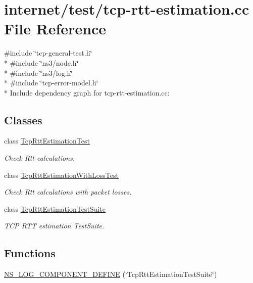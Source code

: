 \hypertarget{tcp-rtt-estimation_8cc}{}\section{internet/test/tcp-\/rtt-\/estimation.cc File Reference}
\label{tcp-rtt-estimation_8cc}
{\ttfamily \#include \char`\"{}tcp-\/general-\/test.\+h\char`\"{}}\\*
{\ttfamily \#include \char`\"{}ns3/node.\+h\char`\"{}}\\*
{\ttfamily \#include \char`\"{}ns3/log.\+h\char`\"{}}\\*
{\ttfamily \#include \char`\"{}tcp-\/error-\/model.\+h\char`\"{}}\\*
Include dependency graph for tcp-\/rtt-\/estimation.cc\+:
\subsection*{Classes}
\begin{DoxyCompactItemize}
\item 
class \hyperlink{classTcpRttEstimationTest}{Tcp\+Rtt\+Estimation\+Test}
\begin{DoxyCompactList}\small\item\em Check Rtt calculations. \end{DoxyCompactList}\item 
class \hyperlink{classTcpRttEstimationWithLossTest}{Tcp\+Rtt\+Estimation\+With\+Loss\+Test}
\begin{DoxyCompactList}\small\item\em Check Rtt calculations with packet losses. \end{DoxyCompactList}\item 
class \hyperlink{classTcpRttEstimationTestSuite}{Tcp\+Rtt\+Estimation\+Test\+Suite}
\begin{DoxyCompactList}\small\item\em T\+CP R\+TT estimation Test\+Suite. \end{DoxyCompactList}\end{DoxyCompactItemize}
\subsection*{Functions}
\begin{DoxyCompactItemize}
\item 
\hyperlink{tcp-rtt-estimation_8cc_ae39bcd0ada63b8ea8b94b0b970b554e0}{N\+S\+\_\+\+L\+O\+G\+\_\+\+C\+O\+M\+P\+O\+N\+E\+N\+T\+\_\+\+D\+E\+F\+I\+NE} (\char`\"{}Tcp\+Rtt\+Estimation\+Test\+Suite\char`\"{})
\end{DoxyCompactItemize}
